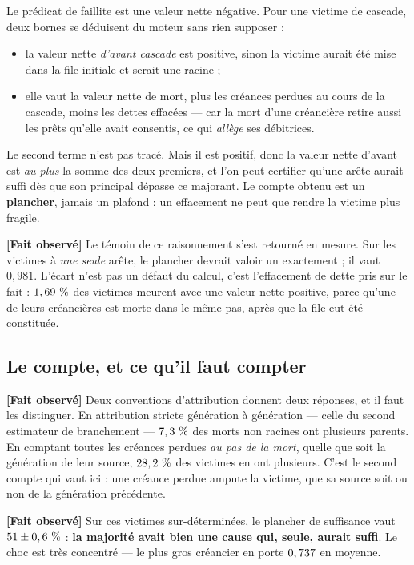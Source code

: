 \documentclass[11pt,a4paper]{article}
\newcommand{\fait}{\textbf{[Fait observé]}}
\begin{document}
Le prédicat de faillite est une valeur nette négative. Pour une victime de
cascade, deux bornes se déduisent du moteur sans rien supposer :

\begin{itemize}
\item la valeur nette \emph{d'avant cascade} est positive, sinon la victime
      aurait été mise dans la file initiale et serait une racine ;
\item elle vaut la valeur nette de mort, plus les créances perdues au cours
      de la cascade, moins les dettes effacées --- car la mort d'une
      créancière retire aussi les prêts qu'elle avait consentis, ce qui
      \emph{allège} ses débitrices.
\end{itemize}

Le second terme n'est pas tracé. Mais il est positif, donc la valeur nette
d'avant est \emph{au plus} la somme des deux premiers, et l'on peut
certifier qu'une arête aurait suffi dès que son principal dépasse ce
majorant. Le compte obtenu est un \textbf{plancher}, jamais un plafond : un
effacement ne peut que rendre la victime plus fragile.

\fait{} Le témoin de ce raisonnement s'est retourné en mesure. Sur les
victimes à \emph{une seule} arête, le plancher devrait valoir un exactement ;
il vaut $0{,}981$. L'écart n'est pas un défaut du calcul, c'est l'effacement
de dette pris sur le fait : $1,69~\%$ des victimes meurent
avec une valeur nette positive, parce qu'une de leurs créancières est morte
dans le même pas, après que la file eut été constituée.

\subsection{Le compte, et ce qu'il faut compter}

\fait{} Deux conventions d'attribution donnent deux réponses, et il faut les
distinguer. En attribution stricte génération à génération --- celle du
second estimateur de branchement --- $7,3~\%$ des morts
non racines ont plusieurs parents. En comptant toutes les créances perdues
\emph{au pas de la mort}, quelle que soit la génération de leur source,
$28,2~\%$ des victimes en ont plusieurs. C'est le second
compte qui vaut ici : une créance perdue ampute la victime, que sa source
soit ou non de la génération précédente.

\fait{} Sur ces victimes sur-déterminées, le plancher de suffisance vaut
$51 \pm 0,6~\%$ : \textbf{la majorité
avait bien une cause qui, seule, aurait suffi}. Le choc est très concentré
--- le plus gros créancier en porte $0,737$ en moyenne.
\end{document}
